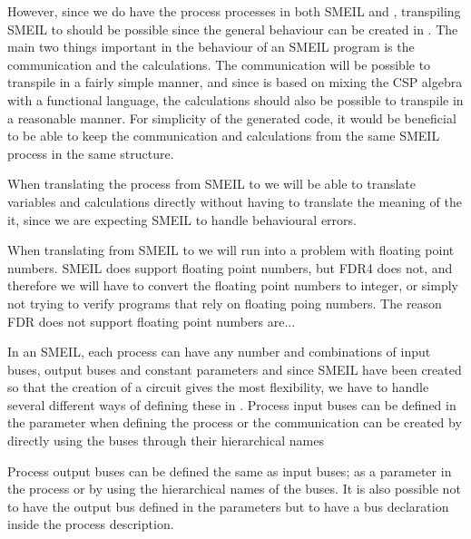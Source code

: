 However, since we do have the process processes in both SMEIL and \cspm, transpiling SMEIL to \cspm should be possible since the general behaviour can be created in \cspm. The main two things important in the behaviour of an SMEIL program is the communication and the calculations. The communication will be possible to transpile in a fairly simple manner, and since \cspm is based on mixing the CSP algebra with a functional language, the calculations should also be possible to transpile in a reasonable manner.
For simplicity of the generated code, it would be beneficial to be able to keep the communication and calculations from the same SMEIL process in the same \cspm structure.

When translating the process from SMEIL to \cspm we will be able to translate variables and calculations directly without having to translate the meaning of the it, since we are expecting SMEIL to handle behavioural errors.

When translating from SMEIL to \cspm we will run into a problem with floating point numbers. SMEIL does support floating point numbers, but FDR4 does not, %
and therefore we will have to convert the floating point numbers to integer, or simply not trying to verify programs that rely on floating poing numbers. The reason FDR does not support floating point numbers are... %


In an SMEIL, each process can have any number and combinations of input buses, output buses and constant parameters and since SMEIL have been created so that the creation of a circuit gives the most flexibility, we have to handle several different ways of defining these in \cspm.
Process input buses can be defined in the parameter when defining the process or the communication can be created by directly using the buses through their hierarchical names %

Process output buses can be defined the same as input buses; as a parameter in the process or by using the hierarchical names of the buses. It is also possible not to have the output bus defined in the parameters but to have a bus declaration inside the process description.

